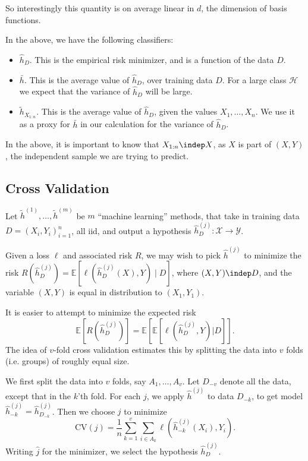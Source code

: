 \documentclass[12pt]{article}
\begin{document}
So interestingly this quantity is on average linear in $d$, the dimension of basis functions.

In the above, we have the following classifiers:
\begin{itemize}
	\item $\hat h_D$. This is the empirical risk minimizer, and is a function of the data $D$.
	\item $\bar h$. This is the average value of $\hat h_D$, over training data $D$. For a large class $\mathcal{H}$ we expect that the variance of $\hat h_D$ will be large.
	\item  $\tilde h_{X_{1:n}}$. This is the average value of $\hat h_D$, given the values $X_1, \ldots, X_n$. We use it as a proxy for $\bar h$ in our calculation for the variance of $\hat h_D$.
\end{itemize}

In the above, it is important to know that $X_{1:n}\indep X$, as $X$ is part of $(X, Y)$, the independent sample we are trying to predict.

\subsection{Cross Validation}
\label{sub:x_val}

Let $\tilde h^{(1)}, \ldots, \tilde h^{(m)}$ be $m$ ``machine learning'' methods, that take in training data $D = (X_i, Y_i)_{i = 1}^n$, all iid, and output a hypothesis $\hat h_D^{(j)} : \mathcal{X} \to \mathcal{Y}$.

Given a loss $\ell$ and associated risk $R$, we may wish to pick $\hat h^{(j)}$ to minimize the risk $R(\hat h_D^{(j)}) = \mathbb{E}[\ell(\hat h_D^{(j)}(X), Y) \mid D]$, where $(X, Y) \indep D$, and the variable $(X, Y)$ is equal in distribution to $(X_1, Y_1)$.

It is easier to attempt to minimize the expected risk
 \[
\mathbb{E}[R(\hat h_D^{(j)})] = \mathbb{E}[\mathbb{E}[\ell(\hat h_D^{(j)}, Y)|D]].
\]
The idea of $v$-fold cross validation estimates this by splitting the data into $v$ folds (i.e. groups) of roughly equal size.


We first split the data into $v$ folds, say $A_1, \ldots, A_v$. Let $D_{-v}$ denote all the data, except that in the $k$'th fold. For each $j$, we apply $\hat h^{(j)}$ to data $D_{-k}$, to get model $\hat h^{(j)}_{-k} = \hat h^{(j)}_{D_{-k}}$. Then we choose $j$ to minimize
\[
\mathrm{CV}(j) = \frac{1}{n} \sum_{k = 1}^v \sum_{i \in A_k} \ell(\hat h^{(j)}_{-k}(X_i), Y_i).
\]
Writing $\hat j$ for the minimizer, we select the hypothesis $\hat h^{(j)}_D$.
\end{document}
